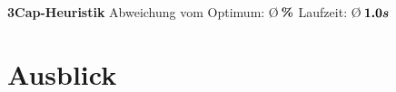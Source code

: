 \documentclass{beamer}
\begin{document}
\begin{frame}
\begin{figure}
\begin{subfigure}[b]{0.3\textwidth}
\end{subfigure}
\begin{subfigure}[b]{0.3\textwidth}
\centering
{}
\end{subfigure}
\begin{subfigure}[b]{0.3\textwidth}
\centering
{}
\end{subfigure}
\end{figure}
\centering
\textbf{3Cap-Heuristik}\linebreak
\centering
Abweichung vom Optimum: \O $\thinspace \boldsymbol{ \%}$\linebreak
\centering
Laufzeit: \O $\thinspace \boldsymbol{1.0 s}$

\end{frame}

\section{Ausblick}
\end{document}

